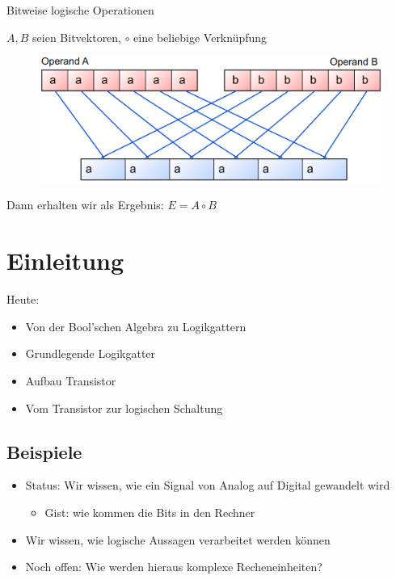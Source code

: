 \documentclass[12pt%
,aspectratio=169%
]{beamer}
\begin{document}
\begin{frame}{Bitweise logische Operationen}
\begin{center}
$A,B$ seien Bitvektoren, $\circ$ eine beliebige Verknüpfung
\begin{figure}
\includegraphics[scale=0.3]{pictures/bitvec}
\end{figure}
Dann erhalten wir als Ergebnis: $E = A \circ B$
\end{center}
\end{frame}

\section{Einleitung}
\begin{frame}{Heute:}
\begin{itemize}
	\item Von der Bool'schen Algebra zu Logikgattern
	\item Grundlegende Logikgatter
	\item Aufbau Transistor
	\item Vom Transistor zur logischen Schaltung
\end{itemize}
\end{frame}
\subsection{Beispiele}
\begin{frame}
	\begin{itemize}
		\item Status: Wir wissen, wie ein Signal von Analog auf Digital gewandelt wird
		\begin{itemize}
			\item Gist: wie kommen die Bits in den Rechner
		\end{itemize}
		\item Wir wissen, wie logische Aussagen verarbeitet werden können
		\item Noch offen: Wie werden hieraus komplexe Recheneinheiten?
	\end{itemize}
\end{frame}
\end{document}
